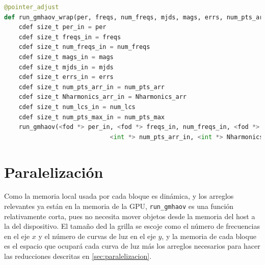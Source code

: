 \begin{lstlisting}[language=Python]
@pointer_adjust
def run_gmhaov_wrap(per, freqs, num_freqs, mjds, mags, errs, num_pts_arr, Nharmonics_arr, num_lcs, num_pts_max,  wmeans_arr, wvars_arr):
    cdef size_t per_in = per
    cdef size_t freqs_in = freqs
    cdef size_t num_freqs_in = num_freqs
    cdef size_t mags_in = mags
    cdef size_t mjds_in = mjds
    cdef size_t errs_in = errs
    cdef size_t num_pts_arr_in = num_pts_arr
    cdef size_t Nharmonics_arr_in = Nharmonics_arr
    cdef size_t num_lcs_in = num_lcs
    cdef size_t num_pts_max_in = num_pts_max
    run_gmhaov(<fod *> per_in, <fod *> freqs_in, num_freqs_in, <fod *> mags_in, <fod *> mjds_in, <fod *> errs_in,
                             <int *> num_pts_arr_in, <int *> Nharmonics_arr_in, num_lcs, num_pts_max_in, <float *> wmeans_arr_in, <float *> wvars_arr_in)
\end{lstlisting}
\section{Paralelización}\label{sec:paralelización-implementacion}
Como la memoria local usada por cada bloque es dinámica, y los arreglos relevantes ya están en la memoria de la GPU, \texttt{run\_gmhaov} es una función relativamente corta, pues no necesita mover objetos desde la memoria del host a la del dispositivo. El tamaño ded la grilla se escoje como el número de frecuencias en el eje $x$ y el número de curvas de luz en el eje $y$, y la memoria de cada bloque es el espacio que ocupará cada curva de luz más los arreglos necesarios para hacer las reducciones descritas en \ref{sec:paralelizacion}.

